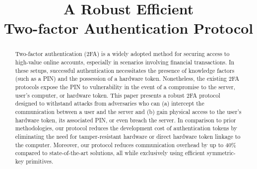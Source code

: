 \documentclass[sigconf, anonymous, review]{acmart}
\makeatletter
\theoremstyle{remark}
\DeclareRobustCommand\onedot{\futurelet\@let@token\@onedot}
\def\@onedot{\ifx\@let@token.\else.\null\fi\xspace}
\def\eg{\emph{e.g}\onedot} \def\Eg{\emph{E.g}\onedot}
\makeatother
\begin{document}
\newtheorem{claim}{Claim}[theorem]
\title{A Robust Efficient\\ Two-factor Authentication Protocol}


\author{}





\begin{abstract}

Two-factor authentication (2FA) is a widely adopted method for securing access to high-value online accounts, especially in scenarios involving financial transactions. In these setups, successful authentication necessitates the presence of knowledge factors (such as a PIN) and the possession of a hardware token. Nonetheless, the existing 2FA protocols expose the PIN to vulnerability in the event of a compromise to the server, user's computer, or hardware token. 
%
This paper presents a robust 2FA protocol designed to withstand attacks from adversaries who can (a) intercept the communication between a user and the server and (b) gain physical access to the user's hardware token, its associated PIN, or even breach the server. In comparison to prior methodologies, our protocol reduces the development cost of authentication tokens by eliminating the need for tamper-resistant hardware or direct hardware token linkage to the computer. Moreover, our protocol reduces communication overhead by up to 40\% compared to state-of-the-art solutions, all while exclusively using efficient symmetric-key primitives.







\end{abstract}
\end{document}
